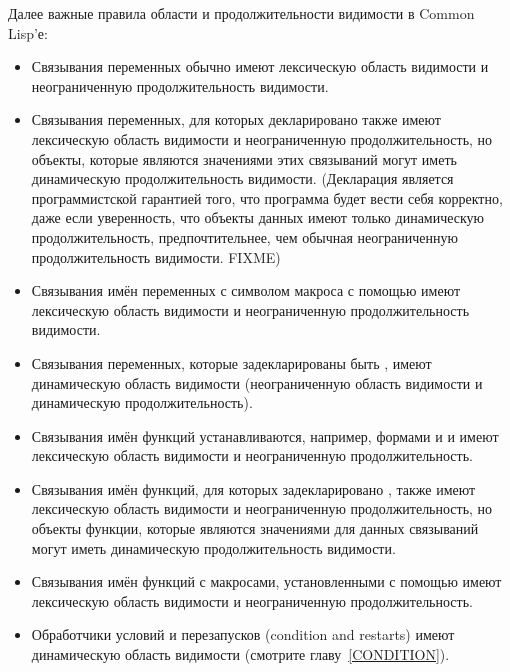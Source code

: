 Далее важные правила области и продолжительности видимости в Common Lisp'е:
\begin{itemize}
\item
Связывания переменных обычно имеют лексическую область видимости и неограниченную
продолжительность видимости.
\end{itemize}

\begin{newer}
\begin{itemize}

\item Связывания переменных, для которых декларировано  также
 имеют лексическую область видимости и неограниченную продолжительность, но
 объекты, которые являются значениями этих связываний могут иметь динамическую
 продолжительность видимости.
(Декларация является программистской гарантией того, что программа будет вести
себя корректно, даже если уверенность, что объекты данных имеют только
динамическую продолжительность, предпочтительнее, чем обычная неограниченную
продолжительность видимости. FIXME)

\item Связывания имён переменных с символом макроса с помощью
   имеют лексическую область видимости и неограниченную
  продолжительность видимости.
\end{itemize}
\end{newer}

\begin{itemize}

\item 
Связывания переменных, которые задекларированы быть ,
имеют динамическую область видимости (неограниченную область видимости и
динамическую продолжительность).
\end{itemize}

\begin{newer}
\begin{itemize}

\item Связывания имён функций устанавливаются, например, формами  и
   и имеют лексическую область видимости и неограниченную продолжительность.

\item Связывания имён функций, для которых задекларировано ,
  также имеют лексическую область видимости и неограниченную продолжительность,
  но объекты функции, которые являются значениями для данных связываний могут
  иметь динамическую продолжительность видимости.

\item Связывания имён функций с макросами, установленными с помощью
   имеют лексическую область видимости и неограниченную
  продолжительность.

\item Обработчики условий и перезапусков (condition and restarts) имеют
  динамическую область видимости (смотрите главу~\ref{CONDITION}).
\end{itemize}
\end{newer}

